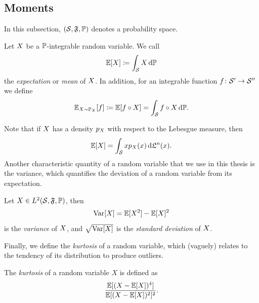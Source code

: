 \subsection{Moments}%
\label{ssec:moments}
In this subsection, \( (\mathcal{S}, \mathfrak{F}, \mathbb{P}) \) denotes a probability space.
\begin{definition}%
	\label{def:expectation}
	Let \( X \) be a \( \mathbb{P} \)-integrable random variable.
	We call
	\begin{equation}
		\mathbb{E}[X] \coloneqq \int_{\mathcal{S}} X\,\mathrm{d}\mathbb{P}
	\end{equation}
	the \emph{expectation} or \emph{mean} of \( X \).
	In addition, for an integrable function \( f \colon \mathcal{S}^\prime \to \mathcal{S}^{\prime\prime} \) we define
	\begin{equation}
		\mathbb{E}_{X\sim\mathbb{P}_X}[f] \coloneqq \mathbb{E}[f \circ X] = \int_{\mathcal{S}} f\circ X\,\mathrm{d}\mathbb{P}.
	\end{equation}
\end{definition}
Note that if \( X \) has a density \( p_X \) with respect to the Lebesgue measure, then
\begin{equation}
	\mathbb{E}[X] = \int_{\mathcal{S}} xp_X(x)\,\mathrm{d}\mathfrak{L}^n(x).
\end{equation}
Another characteristic quantity of a random variable that we use in this thesis is the variance, which quantifies the deviation of a random variable from its expectation.
\begin{definition}%
	\label{def:variance}
	Let \( X \in L^{\num{2}}(\mathcal{S}, \mathfrak{F}, \mathbb{P}) \), then
	\begin{equation}
		\operatorname{Var}[X] = \mathbb{E}[X^{\num{2}}] - \mathbb{E}[X]^{\num{2}}
	\end{equation}
	is the \emph{variance} of \( X \), and \( \sqrt{\operatorname{Var}[X]} \) is the \emph{standard deviation} of \( X \).
\end{definition}
Finally, we define the \emph{kurtosis} of a random variable, which (vaguely) relates to the tendency of its distribution to produce outliers.
\begin{definition}[Kurtosis]
	The \emph{kurtosis} of a random variable \( X \) is defined as
	\begin{equation}
		\frac{\mathbb{E}[(X - \mathbb{E}[X])^4]}{\mathbb{E}[(X - \mathbb{E}[X])^{\num{2}}]^{\num{2}}}.
	\end{equation}
\end{definition}
